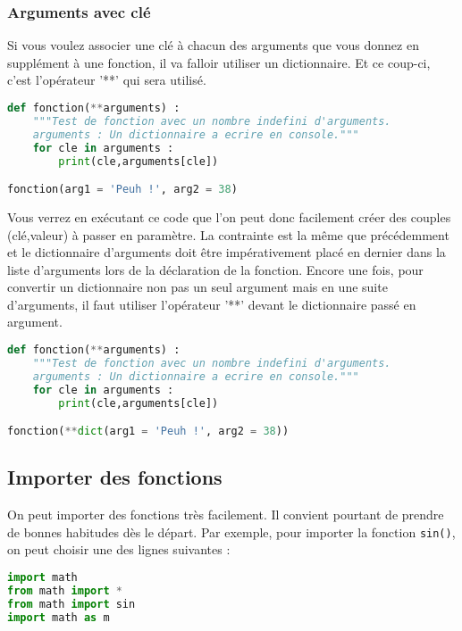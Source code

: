 \documentclass[a4paper,twoside]{article}
\begin{document}
\subsubsection{Arguments avec clé}

Si vous voulez associer une clé à chacun des arguments que vous donnez en supplément à une fonction, il va falloir utiliser un dictionnaire. Et ce coup-ci, c'est l'opérateur '**' qui sera utilisé.

\begin{lstlisting}[language=python]
def fonction(**arguments) :
    """Test de fonction avec un nombre indefini d'arguments.
    arguments : Un dictionnaire a ecrire en console."""
    for cle in arguments :
        print(cle,arguments[cle])

fonction(arg1 = 'Peuh !', arg2 = 38)
\end{lstlisting}

Vous verrez en exécutant ce code que l'on peut donc facilement créer des couples (clé,valeur) à passer en paramètre. La contrainte est la même que précédemment et le dictionnaire d'arguments doit être impérativement placé en dernier dans la liste d'arguments lors de la déclaration de la fonction. Encore une fois, pour convertir un dictionnaire non pas un seul argument mais en une suite d'arguments, il faut utiliser l'opérateur '**' devant le dictionnaire passé en argument.

\begin{lstlisting}[language=python]
def fonction(**arguments) :
    """Test de fonction avec un nombre indefini d'arguments.
    arguments : Un dictionnaire a ecrire en console."""
    for cle in arguments :
        print(cle,arguments[cle])

fonction(**dict(arg1 = 'Peuh !', arg2 = 38))
\end{lstlisting}

\subsection{Importer des fonctions}\label{sec:importer_fonctions}
On peut importer des fonctions très facilement. Il convient pourtant de prendre de bonnes habitudes dès le départ. Par exemple, pour importer la fonction \texttt{sin()}, on peut choisir une des lignes suivantes :
\begin{lstlisting}[language=python]
import math
from math import *
from math import sin
import math as m
\end{lstlisting}
\end{document}
